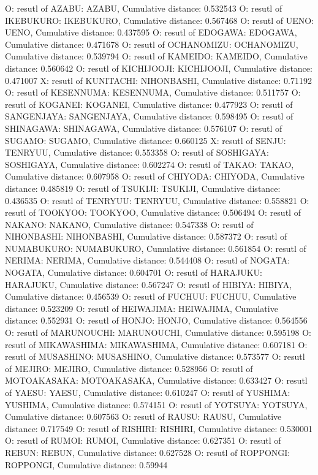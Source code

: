 O: resutl of AZABU: AZABU, Cumulative distance: 0.532543
O: resutl of IKEBUKURO: IKEBUKURO, Cumulative distance: 0.567468
O: resutl of UENO: UENO, Cumulative distance: 0.437595
O: resutl of EDOGAWA: EDOGAWA, Cumulative distance: 0.471678
O: resutl of OCHANOMIZU: OCHANOMIZU, Cumulative distance: 0.539794
O: resutl of KAMEIDO: KAMEIDO, Cumulative distance: 0.560642
O: resutl of KICHIJOOJI: KICHIJOOJI, Cumulative distance: 0.471007
X: resutl of KUNITACHI: NIHONBASHI, Cumulative distance: 0.71192
O: resutl of KESENNUMA: KESENNUMA, Cumulative distance: 0.511757
O: resutl of KOGANEI: KOGANEI, Cumulative distance: 0.477923
O: resutl of SANGENJAYA: SANGENJAYA, Cumulative distance: 0.598495
O: resutl of SHINAGAWA: SHINAGAWA, Cumulative distance: 0.576107
O: resutl of SUGAMO: SUGAMO, Cumulative distance: 0.660125
X: resutl of SENJU: TENRYUU, Cumulative distance: 0.553358
O: resutl of SOSHIGAYA: SOSHIGAYA, Cumulative distance: 0.602274
O: resutl of TAKAO: TAKAO, Cumulative distance: 0.607958
O: resutl of CHIYODA: CHIYODA, Cumulative distance: 0.485819
O: resutl of TSUKIJI: TSUKIJI, Cumulative distance: 0.436535
O: resutl of TENRYUU: TENRYUU, Cumulative distance: 0.558821
O: resutl of TOOKYOO: TOOKYOO, Cumulative distance: 0.506494
O: resutl of NAKANO: NAKANO, Cumulative distance: 0.547338
O: resutl of NIHONBASHI: NIHONBASHI, Cumulative distance: 0.587372
O: resutl of NUMABUKURO: NUMABUKURO, Cumulative distance: 0.561854
O: resutl of NERIMA: NERIMA, Cumulative distance: 0.544408
O: resutl of NOGATA: NOGATA, Cumulative distance: 0.604701
O: resutl of HARAJUKU: HARAJUKU, Cumulative distance: 0.567247
O: resutl of HIBIYA: HIBIYA, Cumulative distance: 0.456539
O: resutl of FUCHUU: FUCHUU, Cumulative distance: 0.523209
O: resutl of HEIWAJIMA: HEIWAJIMA, Cumulative distance: 0.552931
O: resutl of HONJO: HONJO, Cumulative distance: 0.564556
O: resutl of MARUNOUCHI: MARUNOUCHI, Cumulative distance: 0.595198
O: resutl of MIKAWASHIMA: MIKAWASHIMA, Cumulative distance: 0.607181
O: resutl of MUSASHINO: MUSASHINO, Cumulative distance: 0.573577
O: resutl of MEJIRO: MEJIRO, Cumulative distance: 0.528956
O: resutl of MOTOAKASAKA: MOTOAKASAKA, Cumulative distance: 0.633427
O: resutl of YAESU: YAESU, Cumulative distance: 0.610247
O: resutl of YUSHIMA: YUSHIMA, Cumulative distance: 0.574151
O: resutl of YOTSUYA: YOTSUYA, Cumulative distance: 0.607563
O: resutl of RAUSU: RAUSU, Cumulative distance: 0.717549
O: resutl of RISHIRI: RISHIRI, Cumulative distance: 0.530001
O: resutl of RUMOI: RUMOI, Cumulative distance: 0.627351
O: resutl of REBUN: REBUN, Cumulative distance: 0.627528
O: resutl of ROPPONGI: ROPPONGI, Cumulative distance: 0.59944
